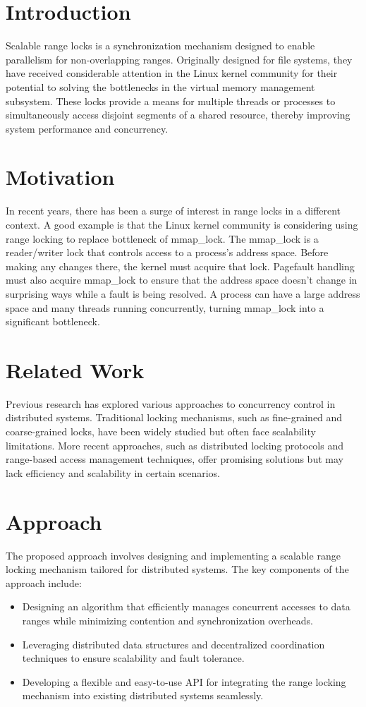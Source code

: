 \section{Introduction}
Scalable range locks is a synchronization mechanism designed to enable parallelism for non-overlapping ranges. Originally designed for file systems, they have received considerable attention\parencite{mmapLock2022} in the Linux kernel community for their potential to solving the bottlenecks in the virtual memory management subsystem. These locks provide a means for multiple threads or processes to simultaneously access disjoint segments of a shared resource, thereby improving system performance and concurrency.


\section{Motivation}
In recent years, there has been a surge of interest in range locks in a different context. A good example is that the Linux kernel community is considering using range locking to replace bottleneck of mmap\_lock\parencite{vmaLock2022}. The mmap\_lock is a reader/writer lock that controls access to a process's address space. Before making any changes there, the kernel must acquire that lock. Pagefault handling must also acquire mmap\_lock to ensure that the address space doesn't change in surprising ways while a fault is being resolved. A process can have a large address space and many threads running concurrently, turning mmap\_lock into a significant bottleneck. 

\section{Related Work}
Previous research has explored various approaches to concurrency control in distributed systems. Traditional locking mechanisms, such as fine-grained and coarse-grained locks, have been widely studied but often face scalability limitations. More recent approaches, such as distributed locking protocols and range-based access management techniques, offer promising solutions but may lack efficiency and scalability in certain scenarios.

\section{Approach}
The proposed approach involves designing and implementing a scalable range locking mechanism tailored for distributed systems. The key components of the approach include:
\begin{itemize}
    \item Designing an algorithm that efficiently manages concurrent accesses to data ranges while minimizing contention and synchronization overheads.
    \item Leveraging distributed data structures and decentralized coordination techniques to ensure scalability and fault tolerance.
    \item Developing a flexible and easy-to-use API for integrating the range locking mechanism into existing distributed systems seamlessly.
\end{itemize}

